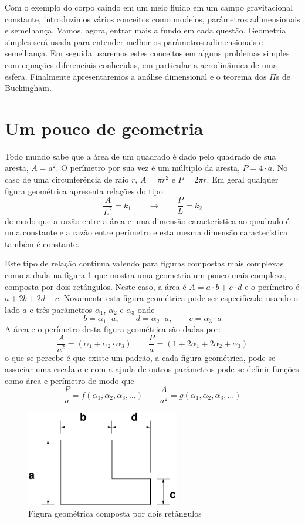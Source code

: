 \documentclass[article,12pt,oneside,a4paper,english,brazil,sumario=tradicional]{abntex2}
\newcommand{\lra}{\ensuremath{\longrightarrow}}
\newcommand{\qqrq}{\ensuremath{\qquad\lra\qquad}}
\begin{document}
Com o exemplo do corpo caindo em um meio fluido em um campo gravitacional constante, introduzimos vários conceitos como modelos, parâmetros adimensionais e semelhança. Vamos, agora, entrar mais a fundo em cada questão. Geometria simples será usada para entender melhor os parâmetros adimensionais e semelhança. Em seguida usaremos estes conceitos em alguns problemas simples com equações diferenciais conhecidas, em particular a aerodinâmica de uma esfera. Finalmente apresentaremos a análise dimensional e o teorema dos $\Pi$s de Buckingham.



\section{Um pouco de geometria}

Todo mundo sabe que a área de um quadrado é dado pelo quadrado de sua aresta, $A=a^2$. O perímetro por sua vez é um múltiplo da aresta, $P = 4\cdot a$. No caso de uma circunferência de raio $r$, $A = \pi r^2$ e $P = 2\pi r$. Em geral qualquer figura geométrica apresenta relações do tipo 
\[
\frac{A}{L^2} = k_1 \qqrq \frac{P}{L} = k_2
\]
de modo que a razão entre a área e uma dimensão característica ao quadrado é uma constante e a razão entre perímetro e esta mesma dimensão característica também é constante. 

Este tipo de relação continua valendo para figuras compostas mais complexas como a dada na figura \ref{fig:L2d} que mostra uma geometria um pouco mais complexa, composta por dois retângulos. Neste caso, a área é $A = a\cdot b + c\cdot d$ e o perímetro é $a + 2b + 2d + c$. Novamente esta figura geométrica pode ser especificada usando o lado $a$ e três parâmetros $\alpha_1$, $\alpha_2$ e $\alpha_3$ onde
\[
b = \alpha_1\cdot a, \qquad d = \alpha_2\cdot a, \qquad c = \alpha_3\cdot a
\]
A área e o perímetro desta figura geométrica são dadas por:
\[
\frac{A}{a^2} = (\alpha_1 + \alpha_2\cdot\alpha_3) \qquad \frac{P}{a} = (1 + 2\alpha_1+2\alpha_2+\alpha_3)
\]
o que se percebe é que existe um padrão, a cada figura geométrica, pode-se associar uma escala $a$ e com a ajuda de outros parâmetros pode-se definir funções como área e perímetro de modo que 
\[
\frac{P}{a} = f(\alpha_1, \alpha_2, \alpha_3, \ldots) \qquad \frac{A}{a^2} = g(\alpha_1, \alpha_2, \alpha_3, \ldots)
\]

\begin{figure}
\centering
\includegraphics[width=0.6\textwidth]{./figuras/L2d.pdf}
\caption{Figura geométrica composta por dois retângulos}
\label{fig:L2d}
\end{figure}
\end{document}
